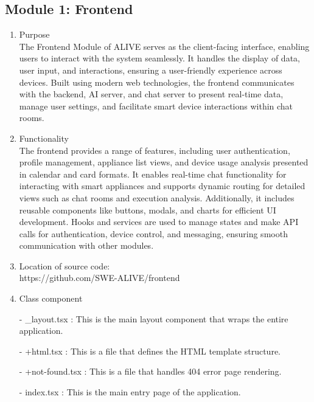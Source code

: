 \documentclass[conference]{IEEEtran}
\begin{document}
\begin{enumerate}
\begin{itemize}
\begin{itemize}
\begin{enumerate}
\begin{table}[h]
\begin{tabular}{|p{3.9cm}|p{4cm}|}
    \end{tabular}
\end{table}


\subsection{Module 1: Frontend}
\begin{enumerate}
    \item Purpose\\
    The Frontend Module of ALIVE serves as the client-facing interface, enabling users to interact with the system seamlessly. It handles the display of data, user input, and interactions, ensuring a user-friendly experience across devices. Built using modern web technologies, the frontend communicates with the backend, AI server, and chat server to present real-time data, manage user settings, and facilitate smart device interactions within chat rooms. \\ 
    \item Functionality \\
    The frontend provides a range of features, including user authentication, profile management, appliance list views, and device usage analysis presented in calendar and card formats. It enables real-time chat functionality for interacting with smart appliances and supports dynamic routing for detailed views such as chat rooms and execution analysis. Additionally, it includes reusable components like buttons, modals, and charts for efficient UI development. Hooks and services are used to manage states and make API calls for authentication, device control, and messaging, ensuring smooth communication with other modules. \\
    
    \item Location of source code:\\ https://github.com/SWE-ALIVE/frontend \\
    \item Class component
        \item[-] \_layout.tsx : This is the main layout component that wraps the entire application.\\
        \item[-] +html.tsx : This is a file that defines the HTML template structure.\\
        \item[-] +not-found.tsx : This is a file that handles 404 error page rendering.\\
        \item[-] index.tsx : This is the main entry page of the application.\\
        

\end{enumerate}
\end{enumerate}
\end{itemize}
\end{itemize}
\end{enumerate}
\end{document}
